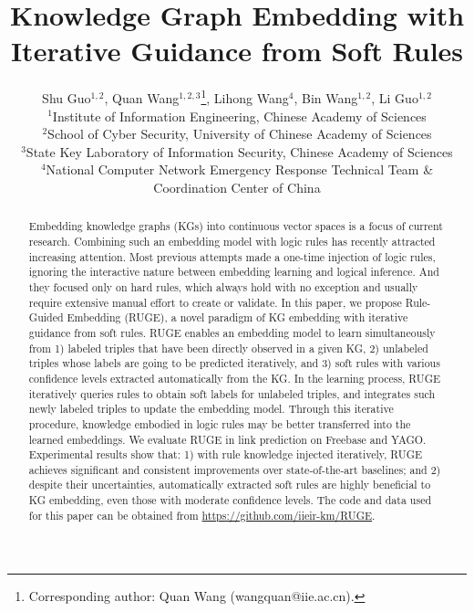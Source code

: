 \documentclass[letterpaper]{article} \usepackage{aaai18}  \usepackage{times}  \usepackage{helvet}  \usepackage{courier}  \usepackage{url}  \usepackage{graphicx}  \usepackage{amsmath}
\begin{document}
\title{Knowledge Graph Embedding with Iterative Guidance from Soft Rules}
\author{Shu Guo$^{1,2}$, Quan Wang$^{1,2,3}$\thanks{Corresponding author: Quan Wang (wangquan@iie.ac.cn).}, Lihong Wang$^{4}$, Bin Wang$^{1,2}$, Li Guo$^{1,2}$ \\
  $^{1}$Institute of Information Engineering, Chinese Academy of Sciences\\
  $^{2}$School of Cyber Security, University of Chinese Academy of Sciences\\
  $^{3}$State Key Laboratory of Information Security, Chinese Academy of Sciences\\
  $^{4}$National Computer Network Emergency Response Technical Team \& Coordination Center of China}
\maketitle
\begin{abstract}
  Embedding knowledge graphs (KGs) into continuous vector spaces is a focus of current research. Combining such an embedding model with logic rules has recently attracted increasing attention. Most previous attempts made a one-time injection of logic rules, ignoring the interactive nature between embedding learning and logical inference. And they focused only on hard rules, which always hold with no exception and usually require extensive manual effort to create or validate. In this paper, we propose Rule-Guided Embedding (RUGE), a novel paradigm of KG embedding with iterative guidance from soft rules. RUGE enables an embedding model to learn simultaneously from 1) labeled triples that have been directly observed in a given KG, 2) unlabeled triples whose labels are going to be predicted iteratively, and 3) soft rules with various confidence levels extracted automatically from the KG. In the learning process, RUGE iteratively queries rules to obtain soft labels for unlabeled triples, and integrates such newly labeled triples to update the embedding model. Through this iterative procedure, knowledge embodied in logic rules may be better transferred into the learned embeddings. We evaluate RUGE in link prediction on Freebase and YAGO. Experimental results show that: 1) with rule knowledge injected iteratively, RUGE achieves significant and consistent improvements over state-of-the-art baselines; and 2) despite their uncertainties, automatically extracted soft rules are highly beneficial to KG embedding, even those with moderate confidence levels. The code and data used for this paper can be obtained from \url{https://github.com/iieir-km/RUGE}.
\end{abstract}
\end{document}

